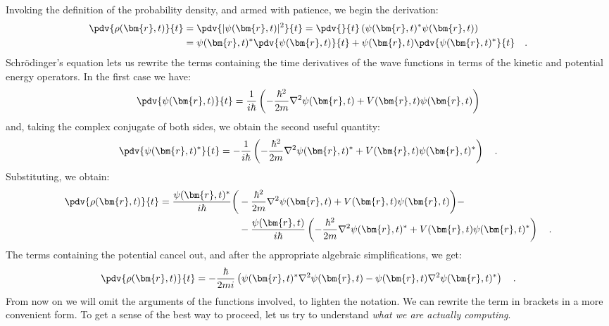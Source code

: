 Invoking the definition of the probability density, and armed with patience, we begin the derivation:
\[
    \begin{aligned}
        \pdv{\rho(\bm{r}, t)}{t} &= \pdv{|\psi(\bm{r}, t)|^2}{t} = \pdv{}{t}\, (\psi(\bm{r}, t)^*\psi(\bm{r}, t)) \\
        &= \psi(\bm{r}, t)^*\pdv{\psi(\bm{r}, t)}{t} + \psi(\bm{r}, t)\pdv{\psi(\bm{r}, t)^*}{t} \quad.
    \end{aligned}
\]
Schrödinger's equation lets us rewrite the terms containing the time derivatives of the wave functions in terms of the kinetic and potential energy operators. In the first case we have:
\[
    \pdv{\psi(\bm{r}, t)}{t} = \frac{1}{i\hbar} \left( -\frac{\hbar^2}{2m}\nabla^2 \psi(\bm{r}, t) + V(\bm{r}, t)\psi(\bm{r}, t) \right)
\]
and, taking the complex conjugate of both sides, we obtain the second useful quantity:
\[
    \pdv{\psi(\bm{r}, t)^*}{t} = -\frac{1}{i\hbar} \left( -\frac{\hbar^2}{2m}\nabla^2 \psi(\bm{r}, t)^* + V(\bm{r}, t)\psi(\bm{r}, t)^* \right) \quad.
\]
Substituting, we obtain:
\[
    \begin{aligned}
        \pdv{\rho(\bm{r}, t)}{t} = \frac{\psi(\bm{r}, t)^*}{i\hbar}\bigg( &-\frac{\hbar^2}{2m}\nabla^2 \psi(\bm{r}, t) + V(\bm{r}, t)\psi(\bm{r}, t) \bigg) -\\ &- \frac{\psi(\bm{r}, t)}{i\hbar}\left( -\frac{\hbar^2}{2m}\nabla^2 \psi(\bm{r}, t)^* + V(\bm{r}, t)\psi(\bm{r}, t)^* \right) \quad.
    \end{aligned}
\]  
The terms containing the potential cancel out, and after the appropriate algebraic simplifications, we get:
\begin{equation}
        \pdv{\rho(\bm{r}, t)}{t} = -\frac{\hbar}{2mi}\left(\psi(\bm{r}, t)^*\nabla^2\psi(\bm{r}, t) - \psi(\bm{r}, t)\nabla^2\psi(\bm{r}, t)^*\right) \quad.
        \label{eq:step_eq_continuità}
\end{equation}
From now on we will omit the arguments of the functions involved, to lighten the notation.
We can rewrite the term in brackets in a more convenient form. To get a sense of the best way to proceed, let us try to understand \emph{what we are actually computing}.

